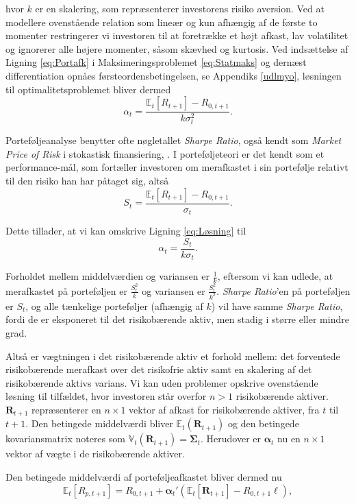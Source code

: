 \documentclass[
  a4paper,
  oneside]{memoir}
\begin{document}
hvor \(k\) er en skalering, som repræsenterer investorens risiko aversion. Ved at modellere ovenstående relation som lineær og kun afhængig af de første to momenter restringerer vi investoren til at foretrække et højt afkast, lav volatilitet og ignorerer alle højere momenter, såsom skævhed og kurtosis. Ved indsættelse af Ligning \eqref{eq:Portafk} i Maksimeringsproblemet \eqref{eq:Statmaks} og dernæst differentiation opnåes førsteordensbetingelsen, se Appendiks \ref{udlmyo}, løsningen til optimalitetsproblemet bliver dermed
\begin{equation}
\alpha_t = \frac{\mathbb{E}_t\left[R_{t+1}\right]-R_{0,t+1}}{k\sigma_t^2}.\label{eq:Løsning}
\end{equation}

Porteføljeanalyse benytter ofte nøgletallet \emph{Sharpe Ratio}, også kendt som \emph{Market Price of Risk} i stokastisk finansiering, \citep{Bjork2009}. I porteføljeteori er det kendt som et performance-mål, som fortæller investoren om merafkastet i sin portefølje relativt til den risiko han har påtaget sig, altså
\[S_t=\frac{\mathbb{E}_t[R_{t+1}]-R_{0,t+1}}{\sigma_t}.\]

Dette tillader, at vi kan omskrive Ligning \eqref{eq:Løsning} til
\[\alpha_t=\frac{S_t}{k\sigma_t}.\]

Forholdet mellem middelværdien og variansen er \(\tfrac{1}{k}\), eftersom vi kan udlede, at merafkastet på porteføljen er \(\tfrac{S_t^2}{k}\) og variansen er \(\tfrac{S_t^2}{k^2}\). \emph{Sharpe Ratio}'en på porteføljen er \(S_t\), og alle tænkelige porteføljer (afhængig af \(k\)) vil have samme \emph{Sharpe Ratio}, fordi de er eksponeret til det risikobærende aktiv, men stadig i større eller mindre grad.

Altså er vægtningen i det risikobærende aktiv et forhold mellem: det forventede risikobærende merafkast over det risikofrie aktiv samt en skalering af det risikobærende aktivs varians. Vi kan uden problemer opskrive ovenstående løsning til tilfældet, hvor investoren står overfor \(n>1\) risikobærende aktiver. \(\bm{R}_{t+1}\) repræsenterer en \(n\times 1\) vektor af afkast for risikobærende aktiver, fra \(t\) til \(t+1\). Den betingede middelværdi bliver \(\mathbb{E}_t(\bm{R}_{t+1})\) og den betingede kovariansmatrix noteres som \(\mathbb{V}_t(\bm{R}_{t+1})=\bm{\Sigma}_t\). Herudover er \(\bm{\alpha}_t\) nu en \(n\times 1\) vektor af vægte i de risikobærende aktiver.

Den betingede middelværdi af porteføljeafkastet bliver dermed nu
\begin{equation}
\mathbb{E}_t[R_{p,t+1}]=R_{0,t+1}+\bm{\alpha}_t'(\mathbb{E}_t[\bm{R}_{t+1}]- R_{0,t+1}\bm{\ell}),
\end{equation}
\end{document}
